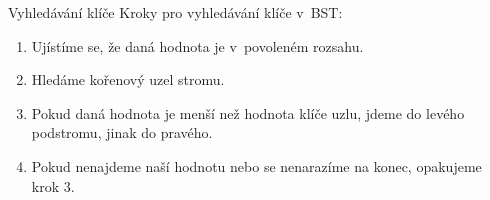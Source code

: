\documentclass[10pt]{beamer}
\begin{document}
\begin{frame}[t]{Vyhledávání klíče}
    Kroky pro vyhledávání klíče v~BST:
    \begin{enumerate}
        \item Ujístíme se, že daná hodnota je v~povoleném rozsahu.
        \item Hledáme kořenový uzel stromu.
        \item Pokud daná hodnota je menší než hodnota klíče uzlu, jdeme do levého podstromu, jinak do pravého.
        \item Pokud nenajdeme naší hodnotu nebo se nenarazíme na konec, opakujeme krok 3.
    \end{enumerate}
\end{frame}
\end{document}
